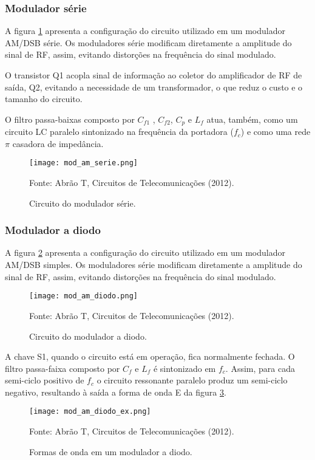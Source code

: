 \subsubsection{Modulador série}

A figura \ref{f_mod_am_serie} apresenta a configuração do circuito utilizado em um modulador AM/DSB série.
Os moduladores série modificam diretamente a amplitude do sinal de RF, assim, evitando distorções na frequência do sinal modulado.

O transistor Q1 acopla sinal de informação ao coletor do amplificador de RF de saída, Q2, evitando a necessidade de um transformador, o que reduz o custo e o tamanho do circuito.

O filtro passa-baixas composto por $C_{f1}$ , $C_{f2}$, $C_p$ e $L_f$ atua, também, como um circuito LC paralelo sintonizado na frequência da portadora ($f_c$) e como uma rede $\pi$ casadora de impedância.

\begin{figure}[H]
    \centering
    \caption{Circuito do modulador série.}
    \texttt{[image: mod\_am\_serie.png]}
    \label{f_mod_am_serie}
    
    \small Fonte: Abrão T, Circuitos de Telecomunicações (2012).
\end{figure}

\subsubsection{Modulador a diodo}

A figura \ref{f_mod_am_diodo} apresenta a configuração do circuito utilizado em um modulador AM/DSB simples.
Os moduladores série modificam diretamente a amplitude do sinal de RF, assim, evitando distorções na frequência do sinal modulado.

\begin{figure}[H]
    \centering
    \caption{Circuito do modulador a diodo.}
    \texttt{[image: mod\_am\_diodo.png]}
    \label{f_mod_am_diodo}
    
    \small Fonte: Abrão T, Circuitos de Telecomunicações (2012).
\end{figure}

A chave S1, quando o circuito está em operação, fica normalmente fechada.
O filtro passa-faixa composto por $C_f$ e $L_f$ é sintonizado em $f_c$. Assim, para cada semi-ciclo positivo de $f_c$ o circuito ressonante paralelo produz um semi-ciclo negativo, resultando à saída a forma de
onda E da figura \ref{f_mod_am_diodo_ex}.



\begin{figure}[H]
    \centering
    \caption{Formas de onda em um modulador a diodo.}
    \texttt{[image: mod\_am\_diodo\_ex.png]}
    \label{f_mod_am_diodo_ex}
    
    \small Fonte: Abrão T, Circuitos de Telecomunicações (2012).
\end{figure}